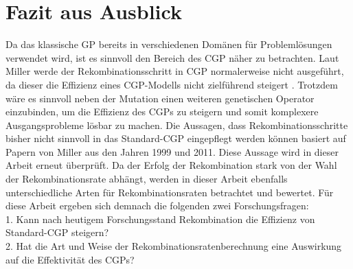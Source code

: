 \chapter{Fazit aus Ausblick}
\label{Fazit}

Da das klassische GP bereits in verschiedenen Domänen für Problemlösungen verwendet wird, ist es sinnvoll den Bereich des CGP näher zu betrachten.
Laut Miller werde der Rekombinationsschritt in CGP normalerweise nicht ausgeführt, da dieser die Effizienz eines CGP-Modells nicht zielführend steigert \cite{miller_cartesian_2020}.
Trotzdem wäre es sinnvoll neben der Mutation einen weiteren genetischen Operator einzubinden, um die Effizienz des CGPs zu steigern und somit komplexere Ausgangsprobleme lösbar zu machen.
Die Aussagen, dass Rekombinationsschritte bisher nicht sinnvoll in das Standard-CGP eingepflegt werden können basiert auf Papern von Miller aus den Jahren 1999 und 2011.
Diese Aussage wird in dieser Arbeit erneut überprüft.
Da der Erfolg der Rekombination stark von der Wahl der Rekombinationsrate abhängt, werden in dieser Arbeit ebenfalls unterschiedliche Arten für Rekombinationsraten betrachtet und bewertet.
Für diese Arbeit ergeben sich demnach die folgenden zwei Forschungsfragen:\\
1. Kann nach heutigem Forschungsstand Rekombination die Effizienz von Standard-CGP steigern?\\
2. Hat die Art und Weise der Rekombinationsratenberechnung eine Auswirkung auf die Effektivität des CGPs?

